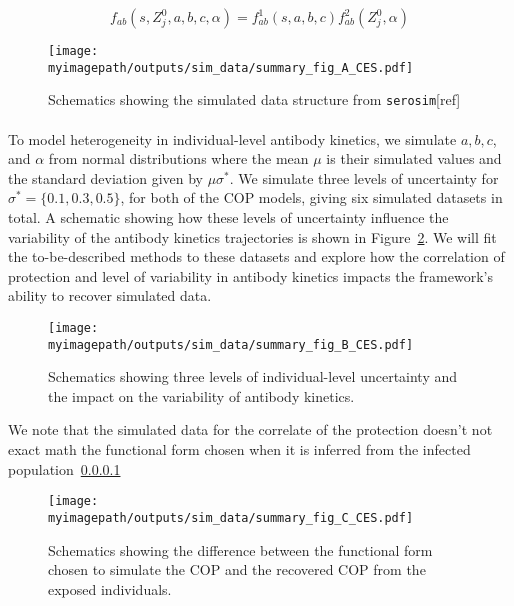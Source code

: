 \documentclass{article}
\newcommand{\myimagepath}{/Users/davidhodgson/Dropbox/Mac (3)/Documents/research/Rpackages/rjmc/}
\begin{document}
\begin{equation}
\label{eq_ab2}
f_{ab}(s, Z^0_{j}, a, b, c, \alpha) = f^1_{ab}(s, a, b, c)f^2_{ab}(Z^0_{j}, \alpha) 
\end{equation}

\begin{figure}[h]
    \centering
    \texttt{[image: \\myimagepath/outputs/sim\_data/summary\_fig\_A\_CES.pdf]}     \caption{Schematics showing the simulated data structure from \texttt{serosim}[ref]}
    \label{fig:sim_A}
\end{figure}



\paragraph{}To model heterogeneity in individual-level antibody kinetics, we simulate $a, b, c$, and $\alpha$ from normal distributions where the mean $\mu$ is their simulated values and the standard deviation given by $\mu\sigma^*$. We simulate three levels of uncertainty for $\sigma^* = \{0.1, 0.3, 0.5\}$, for both of the COP models, giving six simulated datasets in total. A schematic showing how these levels of uncertainty influence the variability of the antibody kinetics trajectories is shown in Figure~\ref{fig:sim_B}. We will fit the to-be-described methods to these datasets and explore how the correlation of protection and level of variability in antibody kinetics impacts the framework's ability to recover simulated data. 


\begin{figure}[h]
    \centering
    \texttt{[image: \\myimagepath/outputs/sim\_data/summary\_fig\_B\_CES.pdf]}     \caption{Schematics showing three levels of individual-level uncertainty and the impact on the variability of antibody kinetics.   }
    \label{fig:sim_B}
\end{figure}

We note that the simulated data for the correlate of the protection doesn't not exact math the functional form chosen when it is inferred from the infected population~\ref{}

\begin{figure}[h]
    \centering
    \texttt{[image: \\myimagepath/outputs/sim\_data/summary\_fig\_C\_CES.pdf]}     \caption{Schematics showing the difference between the functional form chosen to simulate the COP and the recovered COP from the exposed individuals.   }
    \label{fig:sim_C}
\end{figure}
\end{document}
